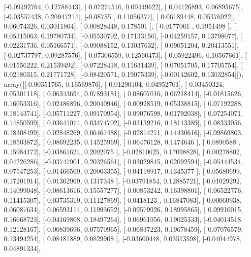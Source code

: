 \documentclass{article}
\begin{document}
       [-0.09492764,  0.12788443],
       [ 0.07274546,  0.09449622],
       [ 0.04126893,  0.06895675],
       [-0.03557438,  0.20947214],
       [-0.08755   ,  0.11056377],
       [ 0.06189448,  0.05376922],
       [ 0.06074326,  0.03011864],
       [ 0.00828448,  0.178501  ],
       [-0.0177061 ,  0.1951498 ],
       [ 0.05315063,  0.19780734],
       [-0.05530702,  0.17133156],
       [-0.04259157,  0.13798077],
       [ 0.02231736,  0.05166571],
       [-0.09088152,  0.13037632],
       [ 0.09051204,  0.20413551],
       [-0.02737797,  0.09287576],
       [ 0.07306559,  0.12560473],
       [-0.05922496,  0.10567661],
       [ 0.01556222,  0.21539492],
       [-0.07228418,  0.11631439],
       [ 0.07051705,  0.17705754],
       [ 0.02180315,  0.21771728],
       [-0.08420571,  0.19075339],
       [-0.00142602,  0.13032854]]), array([[-0.00351765,  0.16569876],
       [-0.01290104,  0.04952701],
       [ 0.03450324,  0.05301118],
       [ 0.06343694,  0.07893181],
       [ 0.08607016,  0.06218414],
       [-0.01815626,  0.16053316],
       [ 0.02486896,  0.20040946],
       [ 0.00928519,  0.05338815],
       [ 0.07192288,  0.18143741],
       [-0.05711227,  0.09170954],
       [ 0.09076598,  0.01792038],
       [ 0.07254071,  0.14850599],
       [ 0.03641074,  0.03474702],
       [-0.03139216,  0.18143389],
       [ 0.08333056,  0.18308499],
       [ 0.02848269,  0.06467488],
       [-0.02814271,  0.14430616],
       [-0.09869803,  0.18503872],
       [ 0.08692235,  0.14525969],
       [ 0.06476128,  0.1474646 ],
       [ 0.0890588 ,  0.15984172],
       [-0.03861624,  0.2092075 ],
       [-0.02810625,  0.17098828],
       [ 0.00278802,  0.04226286],
       [-0.03747901,  0.20326561],
       [ 0.03029845,  0.02092594],
       [-0.05444534,  0.07547253],
       [-0.01466569,  0.20063355],
       [-0.04118917,  0.1345377 ],
       [ 0.05680699,  0.17201914],
       [ 0.01362969,  0.1317348 ],
       [-0.03791854,  0.12885721],
       [-0.01029292,  0.14099048],
       [-0.08613616,  0.15557277],
       [ 0.00853242,  0.16398801],
       [ 0.06522776,  0.11415307],
       [-0.03735319,  0.11127869],
       [ 0.0418123 ,  0.16847083],
       [ 0.00060938,  0.06087634],
       [ 0.06593114,  0.11993652],
       [-0.09579926,  0.18995865],
       [ 0.09910015,  0.16668723],
       [-0.04169808,  0.18497264],
       [ 0.06961956,  0.19025333],
       [-0.04014518,  0.12128167],
       [-0.00839696,  0.07570965],
       [-0.06837223,  0.19678459],
       [ 0.07076579,  0.13494254],
       [ 0.08481889,  0.0829908 ],
       [-0.03600448,  0.03513598],
       [-0.04044978,  0.04891334],
\end{document}
